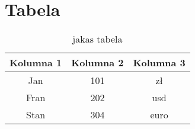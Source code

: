 \documentclass{article}
\begin{document}
\section{Tabela}

\begin{table}[h]
    \centering
    \begin{tabular}{|c|c|c|}
        \hline
       Kolumna 1 & Kolumna 2 & Kolumna 3  \\
        \hline
         Jan & 101 & zł \\
         Fran & 202 & usd \\
         Stan & 304 & euro\\
        \hline
    \end{tabular}
    \caption{jakas tabela}
\end{table}
\end{document}
